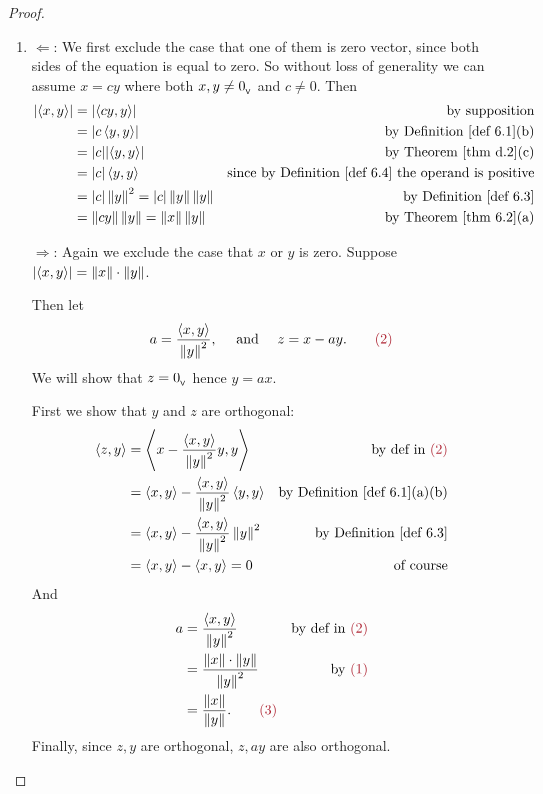 \begin{proof} \ 

\begin{enumerate}
\item
\(\Longleftarrow\):
We first exclude the case that one of them is zero vector, since both sides of the equation is equal to zero.
So without loss of generality we can assume \(x = cy\) where both \(x, y \ne 0_{_{\textsf{V}}}\) and \(c \ne 0\).
Then
\begin{align*}
    \abs{\LG x, y \RG} & = \abs{\LG cy, y \RG} & \text{by supposition} \\
        & = \abs{c \LG y, y \RG} & \text{by \DEF{6.1}(b)} \\
        & = \abs{c} \abs{\LG y, y \RG} & \text{by \THM{d.2}(c)} \\
        & = \abs{c} \LG y, y \RG & \text{since by \DEF{6.4} the operand is positive} \\
        & = \abs{c} \norm{y}^2 = \abs{c} \norm{y} \norm{y} & \text{by \DEF{6.3}} \\
        & = \norm{cy} \norm{y} = \norm{x} \norm{y} & \text{by \THM{6.2}(a)}
\end{align*}

\(\Longrightarrow\):
Again we exclude the case that \(x\) or \(y\) is zero.
Suppose \(\lvert \left< x, y \right> \rvert = \left\lVert x\right\rVert \cdot \left\lVert y\right\rVert\). 

Then let
\[
    a = \frac{\LG x, y \RG}{\norm{y}^2}, \quad \text{ and } \quad z = x - ay. \quad \quad \MAROON{(2)}
\]
We will show that \(z = 0_{_{\textsf{V}}}\) hence \(y = ax\).

First we show that \(y\) and \(z\) are orthogonal:
\begin{align*}
    \LG z, y \RG & = \LG x - \frac{\LG x, y \RG}{\norm{y}^2}y , y \RG & \text{by def in \MAROON{(2)}} \\
        & = \LG x, y \RG - \frac{\LG x, y \RG}{\norm{y}^2} \LG y, y \RG & \text{by \DEF{6.1}(a)(b)} \\
        & = \LG x, y \RG - \frac{\LG x, y \RG}{\norm{y}^2} \norm{y}^2 & \text{by \DEF{6.3}} \\
        & = \LG x, y \RG - \LG x, y \RG = 0 & \text{of course}
\end{align*}
And
\begin{align*}
    a & = \frac{\LG x, y \RG}{\norm{y}^2} & \text{by def in \MAROON{(2)}} \\
      & = \frac{\norm{x} \cdot \norm{y}}{\norm{y}^2} & \text{by \MAROON{(1)}} \\
      & = \frac{\norm{x}}{\norm{y}}. \quad \quad \MAROON{(3)}
\end{align*}
Finally, since \(z, y\) are orthogonal, \(z, ay\) are also orthogonal. 


\end{enumerate}
\end{proof}
